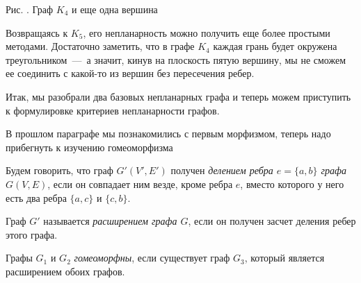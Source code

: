 \begin{paracol}{2}
$ $
\newline
\begin{center}

	\small Рис. \images. Граф $K_4$ и еще одна вершина
\end{center}
	
\switchcolumn

	Возвращаясь к $K_5$, его непланарность можно получить еще более простыми методами. Достаточно заметить, что в графе 
	$K_4$ каждая грань будет окружена треугольником~---~а значит, кинув на плоскость пятую вершину, мы не сможем ее 
	соединить с какой-то из вершин без пересечения ребер.
	
	Итак, мы разобрали два базовых непланарных графа и теперь можем приступить к формулировке критериев непланарности графов.
\end{paracol}

	
	В прошлом параграфе мы познакомились с первым морфизмом, теперь надо прибегнуть к изучению гомеоморфизма
	
\begin{definition}
	Будем говорить, что граф $G'(V', E')$ получен \emph{делением ребра $e = \lbrace a, b\rbrace$ графа $G(V, E)$}, 
	если он совпадает  ним везде, кроме ребра $e$, вместо которого у него есть два ребра $\lbrace a, c\rbrace$ и $\lbrace c, b\rbrace$.
	
	Граф $G'$ называется \emph{расширением графа $G$}, если он получен засчет деления ребер этого графа.
\end{definition}

\begin{definition}
	Графы $G_1$ и $G_2$ \emph{гомеоморфны}, если существует граф $G_3$, который является расширением обоих графов.
\end{definition}

